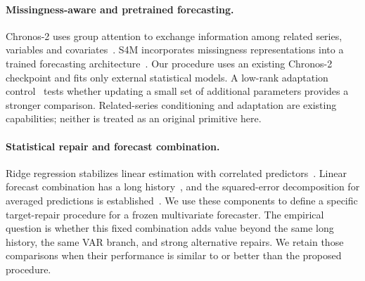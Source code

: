 \paragraph{Missingness-aware and pretrained forecasting.}
Chronos-2 uses group attention to exchange information among related series, variables and covariates~\citep{ansari2025chronos2}. S4M incorporates missingness representations into a trained forecasting architecture~\citep{peng2025s4m}. Our procedure uses an existing Chronos-2 checkpoint and fits only external statistical models. A low-rank adaptation control~\citep{hu2021lora} tests whether updating a small set of additional parameters provides a stronger comparison. Related-series conditioning and adaptation are existing capabilities; neither is treated as an original primitive here.

\paragraph{Statistical repair and forecast combination.}
Ridge regression stabilizes linear estimation with correlated predictors~\citep{hoerl1970ridge}. Linear forecast combination has a long history~\citep{bates1969combination}, and the squared-error decomposition for averaged predictions is established~\citep{krogh1994ensembles}. We use these components to define a specific target-repair procedure for a frozen multivariate forecaster. The empirical question is whether this fixed combination adds value beyond the same long history, the same VAR branch, and strong alternative repairs. We retain those comparisons when their performance is similar to or better than the proposed procedure.
